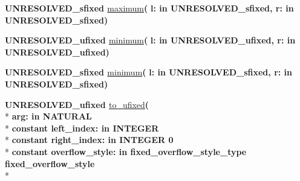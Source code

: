 \begin{DoxyCompactItemize}
\item 
{\bfseries {\bfseries \textcolor{vhdlchar}{U\+N\+R\+E\+S\+O\+L\+V\+E\+D\+\_\+sfixed}\textcolor{vhdlchar}{ }}} \hyperlink{class__fixed__pkg_ad28924ba158c1aecb85d28cf6a8f60e7}{maximum}{\bfseries  ( }{\bfseries \textcolor{vhdlchar}{l\+: }\textcolor{stringliteral}{in }\textcolor{vhdlchar}{U\+N\+R\+E\+S\+O\+L\+V\+E\+D\+\_\+sfixed}}{\bfseries  , \textcolor{vhdlchar}{r\+: }\textcolor{stringliteral}{in }\textcolor{vhdlchar}{U\+N\+R\+E\+S\+O\+L\+V\+E\+D\+\_\+sfixed}}{\bfseries  )} 
\item 
{\bfseries {\bfseries \textcolor{vhdlchar}{U\+N\+R\+E\+S\+O\+L\+V\+E\+D\+\_\+ufixed}\textcolor{vhdlchar}{ }}} \hyperlink{class__fixed__pkg_ad4adeedf9111551b8d7ff73c8ebc0c5a}{minimum}{\bfseries  ( }{\bfseries \textcolor{vhdlchar}{l\+: }\textcolor{stringliteral}{in }\textcolor{vhdlchar}{U\+N\+R\+E\+S\+O\+L\+V\+E\+D\+\_\+ufixed}}{\bfseries  , \textcolor{vhdlchar}{r\+: }\textcolor{stringliteral}{in }\textcolor{vhdlchar}{U\+N\+R\+E\+S\+O\+L\+V\+E\+D\+\_\+ufixed}}{\bfseries  )} 
\item 
{\bfseries {\bfseries \textcolor{vhdlchar}{U\+N\+R\+E\+S\+O\+L\+V\+E\+D\+\_\+sfixed}\textcolor{vhdlchar}{ }}} \hyperlink{class__fixed__pkg_a9d998ae3f8c174511bfd67b611b10096}{minimum}{\bfseries  ( }{\bfseries \textcolor{vhdlchar}{l\+: }\textcolor{stringliteral}{in }\textcolor{vhdlchar}{U\+N\+R\+E\+S\+O\+L\+V\+E\+D\+\_\+sfixed}}{\bfseries  , \textcolor{vhdlchar}{r\+: }\textcolor{stringliteral}{in }\textcolor{vhdlchar}{U\+N\+R\+E\+S\+O\+L\+V\+E\+D\+\_\+sfixed}}{\bfseries  )} 
\item 
{\bfseries {\bfseries \textcolor{vhdlchar}{U\+N\+R\+E\+S\+O\+L\+V\+E\+D\+\_\+ufixed}\textcolor{vhdlchar}{ }}} \hyperlink{class__fixed__pkg_a1c021bc528d8e3b63c69f6bf47c8053e}{to\+\_\+ufixed}{\bfseries  ( }\\*
{\bfseries \textcolor{vhdlchar}{arg\+: }\textcolor{stringliteral}{in }{\bfseries \textcolor{comment}{N\+A\+T\+U\+R\+A\+L}\textcolor{vhdlchar}{ }}}\\*
{\bfseries {\bfseries \textcolor{keywordflow}{constant}\textcolor{vhdlchar}{ }}\textcolor{vhdlchar}{left\+\_\+index\+: }\textcolor{stringliteral}{in }{\bfseries \textcolor{comment}{I\+N\+T\+E\+G\+E\+R}\textcolor{vhdlchar}{ }}}\\*
{\bfseries {\bfseries \textcolor{keywordflow}{constant}\textcolor{vhdlchar}{ }}\textcolor{vhdlchar}{right\+\_\+index\+: }\textcolor{stringliteral}{in }\textcolor{vhdlchar}{I\+N\+T\+E\+G\+E\+R   0}}\\*
{\bfseries {\bfseries \textcolor{keywordflow}{constant}\textcolor{vhdlchar}{ }}\textcolor{vhdlchar}{overflow\+\_\+style\+: }\textcolor{stringliteral}{in }\textcolor{vhdlchar}{fixed\+\_\+overflow\+\_\+style\+\_\+type     fixed\+\_\+overflow\+\_\+style}}\\*

\end{DoxyCompactItemize}
